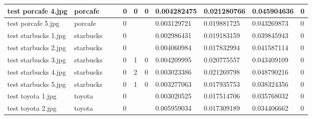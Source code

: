 \begin{landscape}
\begin{longtable}{|p{2cm}|p{1.5cm}|p{2cm}|p{1.5cm}|p{2cm}|p{1cm}|p{2cm}|p{2cm}|p{2cm}|p{2cm}|p{1cm}|}
		test porcafe 4.jpg   & porcafe          &                       &                             & 0                     & 0                       & 0                          & 0.004282475           & 0.021280766           & 0.045904636              & 0                \\ \hline
		test porcafe 5.jpg   & porcafe          &                       &                             & 0                     &                         &                            & 0.003129721           & 0.019881725           & 0.043269873              & 0                \\ \hline
		test starbucks 1.jpg & starbucks        &                       &                             & 0                     &                         &                            & 0.002986431           & 0.019183159           & 0.039845943              & 0                \\ \hline
		test starbucks 2.jpg & starbucks        &                       &                             & 0                     &                         &                            & 0.004060984           & 0.017832994           & 0.041587114              & 0                \\ \hline
		test starbucks 3.jpg & starbucks        &                       &                             & 0                     & 1                       & 0                          & 0.004209995           & 0.020775557           & 0.043409109              & 0                \\ \hline
		test starbucks 4.jpg & starbucks        &                       &                             & 0                     & 2                       & 0                          & 0.003023386           & 0.021269798           & 0.048790216              & 0                \\ \hline
		test starbucks 5.jpg & starbucks        &                       &                             & 0                     & 1                       & 0                          & 0.003277063           & 0.017935753           & 0.038324356              & 0                \\ \hline
		test toyota 1.jpg    & toyota           &                       &                             & 0                     &                         &                            & 0.003020525           & 0.017514706           & 0.035768032              & 0                \\ \hline
		test toyota 2.jpg    & toyota           &                       &                             & 0                     &                         &                            & 0.005959034           & 0.017309189           & 0.034406662              & 0                \\ \hline

\end{longtable}
\end{landscape}
